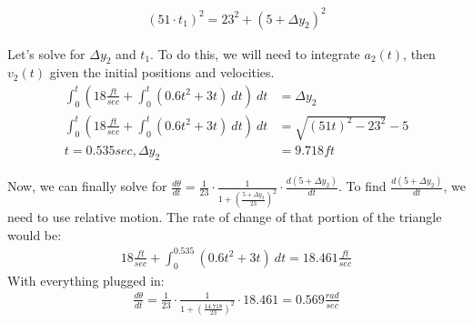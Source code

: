 \documentclass[xcolor={usenames, dvipsnames}]{beamer}
\begin{document}
\begin{frame}
    \begin{figure}[t]
    \end{figure}
    \vspace{-1cm}

    \begin{align*}
        (51 \cdot t_1)^2 = 23^2 + (5+\Delta y_2)^2
    \end{align*}
    
    Let's solve for $\Delta y_2$ and $t_1$. To do this, we will need to integrate $a_2(t)$, 
    then $v_2(t)$ given the initial positions and velocities. 
    \begin{align*}
       \int_{0}^{t} (18\frac{ft}{sec}+\int_{0}^{t} (0.6t^2+3t) \ dt) \ dt &= \Delta y_2 \\
       \int_{0}^{t} (18\frac{ft}{sec}+\int_{0}^{t} (0.6t^2+3t) \ dt) \ dt &= \sqrt{(51t)^2 - 23^2} - 5 \\
       t = 0.535 sec, \Delta y_2 &= 9.718 ft
    \end{align*}
\end{frame}
\begin{frame}
    Now, we can finally solve for
        $\frac{d\theta}{dt} = \frac{1}{23} \cdot \frac{1}{1 + (\frac{5 + \Delta y_{2}}{23})^2} \cdot \frac{d(5 + \Delta y_{2})}{dt}$. To find $\frac{d(5+\Delta y_2)}{dt}$, we need to use relative motion. The
    rate of change of that portion of the triangle would be:
    \begin{align*}
        18\frac{ft}{sec}+\int_{0}^{0.535}(0.6t^2+3t) \ dt = 18.461 \frac{ft}{sec}
    \end{align*}
    With everything plugged in:
    \begin{align*}
        \frac{d\theta}{dt} = \frac{1}{23} \cdot \frac{1}{1 + (\frac{14.718}{23})^2} \cdot 18.461 = 0.569 \frac{rad}{sec}
    \end{align*}
\end{frame}

    
\end{document}
